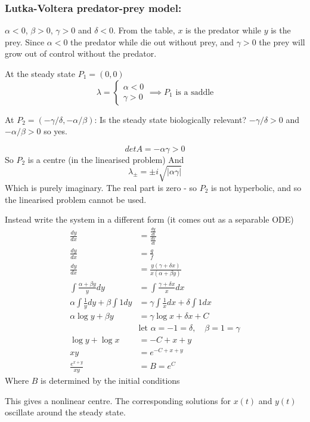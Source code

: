 \documentclass{/home/janmebows/Documents/LatexTemplates/myassignment}
\begin{document}
\subsubsection{Lutka-Voltera predator-prey model:}
$\alpha <0$, $\beta > 0$, $\gamma > 0$ and $\delta < 0$.
From the table, $x$ is the predator while $y$ is the prey. Since $\alpha <0$ the predator while die out without prey, and $\gamma >0$ the prey will grow out of control without the predator.

At the steady state $P_1 = (0,0)$
\[\lambda = \begin{cases}\alpha < 0\\\gamma > 0\end{cases} \implies P_1 \text{ is a saddle}\]

At $P_2 = (-\gamma/\delta, -\alpha/\beta)$:
Is the steady state biologically relevant? $-\gamma/\delta > 0$ and $-\alpha/\beta >0$ so yes.

\[det A = -\alpha\gamma > 0\]
So $P_2$ is a centre (in the linearised problem)
And
\[\lambda_\pm = \pm i \sqrt{|\alpha \gamma|}\]
Which is purely imaginary. The real part is zero - so $P_2$ is not hyperbolic, and so the linearised problem cannot be used.


Instead write the system in a different form (it comes out as a separable ODE)
\begin{align*}
    \frac{dy}{dx} &= \frac{\frac{dy}{dt}}{\frac{dx}{dt}}\\
    \frac{dy}{dx} &= \frac{g}{f} \\
    \frac{dy}{dx} &= \frac{y(\gamma + \delta x)}{x(\alpha + \beta y)}\\
    \int \frac{\alpha + \beta y}y dy &= \int \frac{\gamma + \delta x}{x} dx\\
    \alpha \int \frac1y dy + \beta \int 1 dy &= \gamma \int \frac1x dx + \delta \int 1 dx\\
    \alpha \log y + \beta y &= \gamma \log x + \delta x + C\\
    &\text{let } \alpha = -1 = \delta,\quad \beta =1 =\gamma\\
    \log y + \log x &= - C + x + y\\
    xy &= e^{-C+x+y}\\
    \frac{e^{x+y}}{xy} &= B = e^{C}
\end{align*}
Where $B$ is determined by the initial conditions



This gives a nonlinear centre.
The corresponding solutions for $x(t)$ and $y(t)$ oscillate around the steady state.
\end{document}
